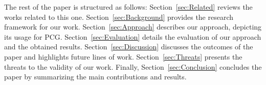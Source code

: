 The rest of the paper is structured as follows: Section~\ref{sec:Related} reviews the works related to this one. Section~\ref{sec:Background} provides the research framework for our work. Section~\ref{sec:Approach} describes our approach, depicting its usage for PCG. Section~\ref{sec:Evaluation} details the evaluation of our approach and the obtained results. Section~\ref{sec:Discussion} discusses the outcomes of the paper and highlights future lines of work. Section~\ref{sec:Threats} presents the threats to the validity of our work. Finally, Section~\ref{sec:Conclusion} concludes the paper by summarizing the main contributions and results.